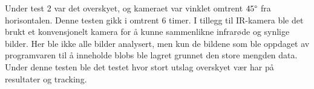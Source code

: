 Under test 2 var det overskyet, og kameraet var vinklet omtrent $45\degree$ fra horisontalen. Denne testen gikk i omtrent 6 timer. I tillegg til IR-kamera ble det brukt et konvensjonelt kamera for å kunne sammenlikne infrarøde og synlige bilder. Her ble ikke alle bilder analysert, men kun de bildene som ble oppdaget av programvaren til å inneholde blobs ble lagret grunnet den store mengden data. Under denne testen ble det testet hvor stort utslag overskyet vær har på resultater og tracking.

